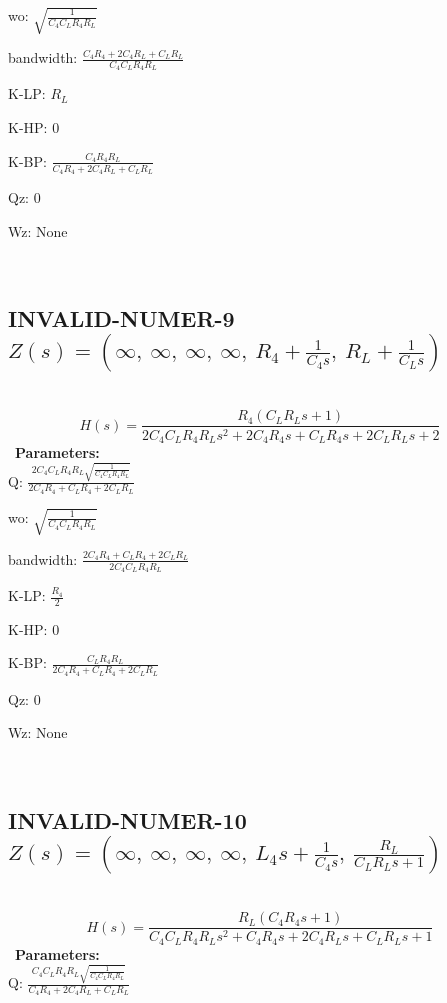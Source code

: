 \documentclass{article}
\begin{document}
wo: $\sqrt{\frac{1}{C_{4} C_{L} R_{4} R_{L}}}$\ 

bandwidth: $\frac{C_{4} R_{4} + 2 C_{4} R_{L} + C_{L} R_{L}}{C_{4} C_{L} R_{4} R_{L}}$\ 

K-LP: $R_{L}$\ 

K-HP: $0$\ 

K-BP: $\frac{C_{4} R_{4} R_{L}}{C_{4} R_{4} + 2 C_{4} R_{L} + C_{L} R_{L}}$\ 

Qz: $0$\ 

Wz: $\text{None}$\ 

\ 

\subsection{INVALID-NUMER-9 $Z(s) = \left( \infty, \  \infty, \  \infty, \  \infty, \  R_{4} + \frac{1}{C_{4} s}, \  R_{L} + \frac{1}{C_{L} s}\right)$ } \ 
\textbf{\[H(s) = \frac{R_{4} \left(C_{L} R_{L} s + 1\right)}{2 C_{4} C_{L} R_{4} R_{L} s^{2} + 2 C_{4} R_{4} s + C_{L} R_{4} s + 2 C_{L} R_{L} s + 2}\] } \ 
\textbf{Parameters:}\\ 

Q: $\frac{2 C_{4} C_{L} R_{4} R_{L} \sqrt{\frac{1}{C_{4} C_{L} R_{4} R_{L}}}}{2 C_{4} R_{4} + C_{L} R_{4} + 2 C_{L} R_{L}}$\ 

wo: $\sqrt{\frac{1}{C_{4} C_{L} R_{4} R_{L}}}$\ 

bandwidth: $\frac{2 C_{4} R_{4} + C_{L} R_{4} + 2 C_{L} R_{L}}{2 C_{4} C_{L} R_{4} R_{L}}$\ 

K-LP: $\frac{R_{4}}{2}$\ 

K-HP: $0$\ 

K-BP: $\frac{C_{L} R_{4} R_{L}}{2 C_{4} R_{4} + C_{L} R_{4} + 2 C_{L} R_{L}}$\ 

Qz: $0$\ 

Wz: $\text{None}$\ 

\ 

\subsection{INVALID-NUMER-10 $Z(s) = \left( \infty, \  \infty, \  \infty, \  \infty, \  L_{4} s + \frac{1}{C_{4} s}, \  \frac{R_{L}}{C_{L} R_{L} s + 1}\right)$ } \ 
\textbf{\[H(s) = \frac{R_{L} \left(C_{4} R_{4} s + 1\right)}{C_{4} C_{L} R_{4} R_{L} s^{2} + C_{4} R_{4} s + 2 C_{4} R_{L} s + C_{L} R_{L} s + 1}\] } \ 
\textbf{Parameters:}\\ 

Q: $\frac{C_{4} C_{L} R_{4} R_{L} \sqrt{\frac{1}{C_{4} C_{L} R_{4} R_{L}}}}{C_{4} R_{4} + 2 C_{4} R_{L} + C_{L} R_{L}}$\ 
\end{document}
